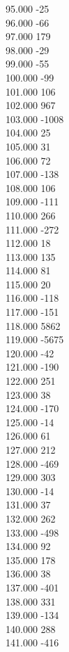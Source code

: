 { 95.000	-25 \\
 96.000	-66 \\
 97.000	179 \\
 98.000	-29 \\
 99.000	-55 \\
 100.000	-99 \\
 101.000	106 \\
 102.000	967 \\
 103.000	-1008 \\
 104.000	25 \\
 105.000	31 \\
 106.000	72 \\
 107.000	-138 \\
 108.000	106 \\
 109.000	-111 \\
 110.000	266 \\
 111.000	-272 \\
 112.000	18 \\
 113.000	135 \\
 114.000	81 \\
 115.000	20 \\
 116.000	-118 \\
 117.000	-151 \\
 118.000	5862 \\
 119.000	-5675 \\
 120.000	-42 \\
 121.000	-190 \\
 122.000	251 \\
 123.000	38 \\
 124.000	-170 \\
 125.000	-14 \\
 126.000	61 \\
 127.000	212 \\
 128.000	-469 \\
 129.000	303 \\
 130.000	-14 \\
 131.000	37 \\
 132.000	262 \\
 133.000	-498 \\
 134.000	92 \\
 135.000	178 \\
 136.000	38 \\
 137.000	-401 \\
 138.000	331 \\
 139.000	-134 \\
 140.000	288 \\
 141.000	-416 \\
}
